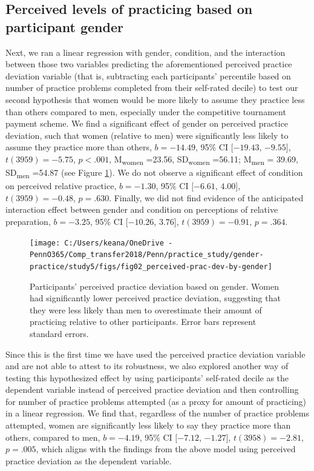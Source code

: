 \documentclass[a4paper, nobind]{templates/ociamthesis}
\begin{document}
\hypertarget{perceived-levels-of-practicing-based-on-participant-gender}{%
\subsection{Perceived levels of practicing based on participant gender}\label{perceived-levels-of-practicing-based-on-participant-gender}}

Next, we ran a linear regression with gender, condition, and the interaction between those two variables predicting the aforementioned perceived practice deviation variable (that is, subtracting each participants' percentile based on number of practice problems completed from their self-rated decile) to test our second hypothesis that women would be more likely to assume they practice less than others compared to men, especially under the competitive tournament payment scheme. We find a significant effect of gender on perceived practice deviation, such that women (relative to men) were significantly less likely to assume they practice more than others, \(b = -14.49\), 95\% CI \([-19.43\), \(-9.55]\), \(t(3959) = -5.75\), \(p < .001\), M\textsubscript{women} =23.56, SD\textsubscript{women} =56.11; M\textsubscript{men} = 39.69, SD\textsubscript{men} =54.87 (see Figure \ref{fig:s410}). We do not observe a significant effect of condition on perceived relative practice, \(b = -1.30\), 95\% CI \([-6.61\), \(4.00]\), \(t(3959) = -0.48\), \(p = .630\). Finally, we did not find evidence of the anticipated interaction effect between gender and condition on perceptions of relative preparation, \(b = -3.25\), 95\% CI \([-10.26\), \(3.76]\), \(t(3959) = -0.91\), \(p = .364\).

\begin{figure}

{\centering \texttt{[image: C:/Users/keana/OneDrive - PennO365/Comp\_transfer2018/Penn/practice\_study/gender-practice/study5/figs/fig02\_perceived-prac-dev-by-gender]} 

}

\caption{Participants' perceived practice deviation based on gender. Women had significantly lower perceived practice deviation, suggesting that they were less likely than men to overestimate their amount of practicing relative to other participants. Error bars represent standard errors.}\label{fig:s410}
\end{figure}

Since this is the first time we have used the perceived practice deviation variable and are not able to attest to its robustness, we also explored another way of testing this hypothesized effect by using participants' self-rated decile as the dependent variable instead of perceived practice deviation and then controlling for number of practice problems attempted (as a proxy for amount of practicing) in a linear regression. We find that, regardless of the number of practice problems attempted, women are significantly less likely to say they practice more than others, compared to men, \(b = -4.19\), 95\% CI \([-7.12\), \(-1.27]\), \(t(3958) = -2.81\), \(p = .005\), which aligns with the findings from the above model using perceived practice deviation as the dependent variable.
\end{document}
